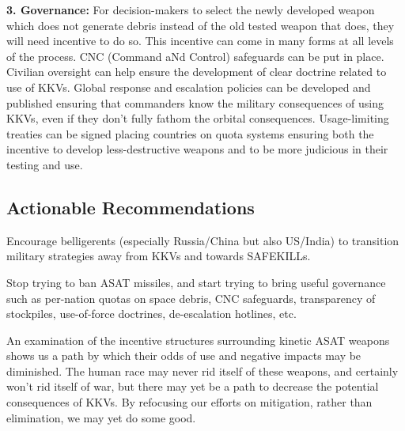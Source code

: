 \textbf{3. Governance:} For decision-makers to select the newly
developed weapon which does not generate debris instead of the old
tested weapon that does, they will need incentive to do so.  This
incentive can come in many forms at all levels of the process. CNC
(Command aNd Control) safeguards can be put in place.  Civilian
oversight can help ensure the development of clear doctrine related to
use of KKVs.  Global response and escalation policies can be developed
and published ensuring that commanders know the military consequences
of using KKVs, even if they don't fully fathom the orbital
consequences.  Usage-limiting treaties can be signed placing countries
on quota systems ensuring both the incentive to develop
less-destructive weapons and to be more judicious in their testing and
use.

\subsection{Actionable Recommendations}

Encourage belligerents (especially Russia/China but also US/India) to
transition military strategies away from KKVs and towards SAFEKILLs.

Stop trying to ban ASAT missiles, and start trying to bring useful
governance such as per-nation quotas on space debris, CNC safeguards,
transparency of stockpiles, use-of-force doctrines, de-escalation
hotlines, etc.

An examination of the incentive structures surrounding kinetic ASAT
weapons shows us a path by which their odds of use and negative
impacts may be diminished.  The human race may never rid itself of
these weapons, and certainly won't rid itself of war, but there may
yet be a path to decrease the potential consequences of KKVs.  By
refocusing our efforts on mitigation, rather than elimination, we may
yet do some good.
